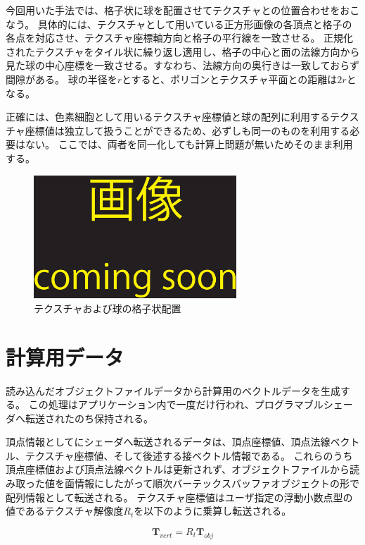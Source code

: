 今回用いた手法では、格子状に球を配置させてテクスチャとの位置合わせをおこなう。
具体的には、テクスチャとして用いている正方形画像の各頂点と格子の各点を対応させ、テクスチャ座標軸方向と格子の平行線を一致させる。
正規化されたテクスチャをタイル状に繰り返し適用し、格子の中心と面の法線方向から見た球の中心座標を一致させる。すなわち、法線方向の奥行きは一致しておらず間隙がある。
球の半径を$r$とすると、ポリゴンとテクスチャ平面との距離は$2r$となる\figref{}。

正確には、色素細胞として用いるテクスチャ座標値と球の配列に利用するテクスチャ座標値は独立して扱うことができるため、必ずしも同一のものを利用する必要はない。
ここでは、両者を同一化しても計算上問題が無いためそのまま利用する。

\begin{figure}[h]
  \centering
  \includegraphics[width=3.0in]{./img/TEMP}
  \caption{テクスチャおよび球の格子状配置}
  \label{FGrid}
\end{figure}

\section{計算用データ}
\label{SObjfile}

読み込んだオブジェクトファイルデータから計算用のベクトルデータを生成する。
この処理はアプリケーション内で一度だけ行われ、プログラマブルシェーダへ転送されたのち保持される。


頂点情報としてにシェーダへ転送されるデータは、頂点座標値、頂点法線ベクトル、テクスチャ座標値、そして後述する接ベクトル情報である。
これらのうち頂点座標値および頂点法線ベクトルは更新されず、オブジェクトファイルから読み取った値を面情報にしたがって順次バーテックスバッファオブジェクトの形で配列情報として転送される。
テクスチャ座標値はユーザ指定の浮動小数点型の値であるテクスチャ解像度$R_t$を以下のように乗算し転送される。

\begin{equation}
{\bm T_{vert}} = R_{t}{\bm T_{obj}}
\end{equation}

